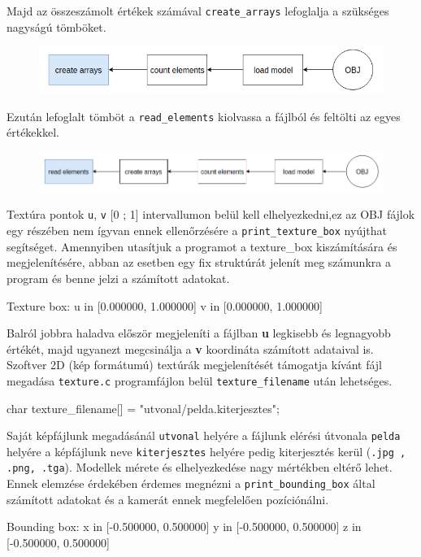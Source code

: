Majd az összeszámolt értékek számával \texttt{create\_arrays} lefoglalja a szükséges nagyságú tömböket.
\begin{figure}[h]
\centering
\includegraphics[scale=0.5]{images/create.png}
\end{figure}
\bigskip
\newpage
Ezután lefoglalt tömböt  a \texttt{read\_elements} kiolvassa a fájlból és feltölti az egyes értékekkel.
\begin{figure}[h]
\centering
\includegraphics[scale=0.5]{images/read.png}
\end{figure}
Textúra pontok \texttt{u}, \texttt{v} [0 ; 1] intervallumon belül kell elhelyezkedni,ez az OBJ fájlok egy részében nem ígyvan ennek ellenőrzésére  a  \texttt{print\_texture\_box} nyújthat segítséget. Amennyiben utasítjuk a programot  a texture\_box kiszámítására és megjelenítésére, abban az esetben egy fix struktúrát jelenít meg számunkra a program és benne jelzi a számított adatokat.
\begin{python}
Texture box:
u in [0.000000, 1.000000]
v in [0.000000, 1.000000]
\end{python}

Balról jobbra haladva először megjeleníti a fájlban \textbf{u} legkisebb és legnagyobb értékét, majd ugyanezt megcsinálja a \textbf{v} koordináta számított adataival is.\\

Szoftver 2D (kép formátumú) textúrák megjelenítését támogatja  kívánt fájl megadása \texttt{texture.c} programfájlon belül \texttt{texture\_filename} után lehetséges.
\bigskip
\begin{cpp}
char texture_filename[] = "utvonal/pelda.kiterjesztes";
\end{cpp}
\bigskip

Saját képfájlunk megadásánál \texttt{utvonal} helyére a fájlunk elérési útvonala \texttt{pelda} helyére a képfájlunk neve \texttt{kiterjesztes} helyére pedig kiterjesztés kerül (\texttt{.jpg , .png, .tga}).
Modellek mérete és elhelyezkedése nagy mértékben eltérő lehet. Ennek elemzése érdekében érdemes megnézni a \texttt{print\_bounding\_box} által számított adatokat és a kamerát ennek megfelelően pozíciónálni.
\bigskip
\begin{python}
Bounding box:
x in [-0.500000, 0.500000]
y in [-0.500000, 0.500000]
z in [-0.500000, 0.500000]
\end{python}
\bigskip

